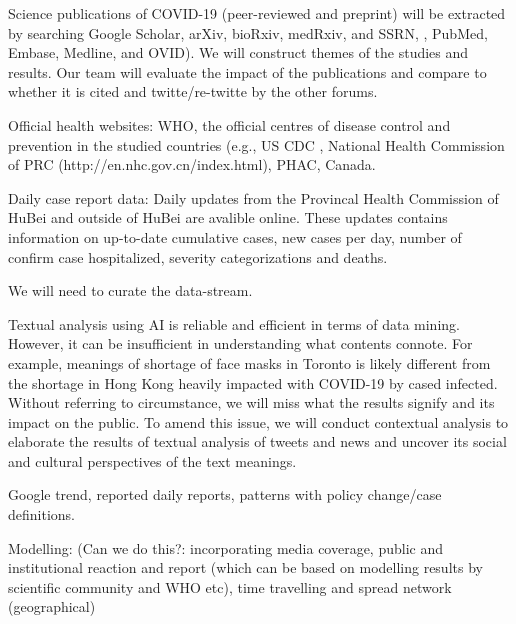 Science publications of COVID-19 (peer-reviewed and preprint) will be extracted by searching Google Scholar, arXiv, bioRxiv, medRxiv, and SSRN, , PubMed, Embase, Medline, and OVID).  We will construct themes of the studies and results.  Our team will evaluate the impact of the publications and compare to whether it is cited and twitte/re-twitte by the other forums.  

Official health websites:  WHO, the official centres of disease control and prevention in the studied countries (e.g., US CDC , National Health Commission of PRC (http://en.nhc.gov.cn/index.html), PHAC, Canada. 

Daily case report data: Daily updates from the Provincal Health Commission of HuBei and outside of HuBei are avalible online. These updates contains information on up-to-date cumulative cases, new cases per day, number of confirm case hospitalized, severity categorizations and deaths.


We will need to curate the data-stream.
 


Textual analysis using AI is reliable and efficient in terms of data mining.  However, it can be insufficient in understanding what contents connote.  For example, meanings of shortage of face masks in Toronto is likely different from the shortage in Hong Kong heavily impacted with COVID-19 by cased infected.  Without referring to circumstance, we will miss what the results signify and its impact on the public.  To amend this issue, we will conduct contextual analysis \citep{} to elaborate the results of textual analysis of tweets and news and uncover its social and cultural perspectives of the text meanings.


Google trend, reported daily reports, patterns with policy change/case definitions.


Modelling: (Can we do this?: incorporating media coverage, public and institutional reaction and report (which can be based on modelling results by scientific community and WHO etc), time travelling and spread network (geographical)



